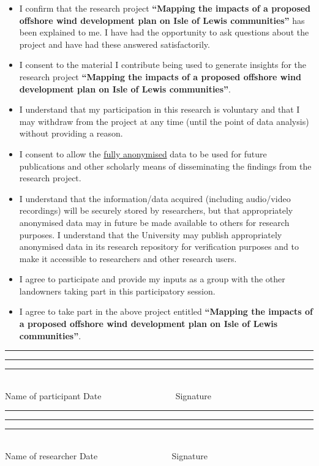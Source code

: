 {\begin{itemize}[label=]
  \item I confirm that the research project \textbf{``Mapping the impacts of a proposed offshore wind development plan on Isle of Lewis communities''} has been explained to me. I have had the opportunity to ask questions about the project and have had these answered satisfactorily.
  \item I consent to the material I contribute being used to generate insights for the research project \textbf{``Mapping the impacts of a proposed offshore wind development plan on Isle of Lewis communities''}.
  \item I understand that my participation in this research is voluntary and that I may withdraw from the project at any time (until the point of data analysis) without providing a reason.
  \item I consent to allow the \underline{fully anonymised} data to be used for future publications and other scholarly means of disseminating the findings from the research project.
  \item I understand that the information/data acquired (including audio/video recordings) will be securely stored by researchers, but that appropriately anonymised data may in future be made available to others for research purposes. I understand that the University may publish appropriately anonymised data in its research repository for verification purposes and to make it accessible to researchers and other research users.
  \item I agree to participate and provide my inputs as a group with the other landowners taking part in this participatory session.
  \item I agree to take part in the above project entitled \textbf{``Mapping the impacts of a proposed offshore wind development plan on Isle of Lewis communities''}.
\end{itemize}

\vspace{50pt}
\begin{center}
  \footnotesize
  \rule{100pt}{.5pt} \hfill \rule{100pt}{.5pt} \hfill \rule{100pt}{.5pt}\\
  Name of participant \hfill Date \hfill ~~~~~~~~~~~~~~~~ Signature \\[35pt]
  \rule{100pt}{.5pt} \hfill \rule{100pt}{.5pt} \hfill \rule{100pt}{.5pt}\\
  Name of researcher \hfill Date \hfill ~~~~~~~~~~~~~~~~ Signature
\end{center}
}
